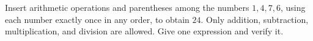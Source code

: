 Insert arithmetic operations and parentheses among the numbers $1,4,7,6$, using each number exactly once in any order, to obtain $24$. Only addition, subtraction, multiplication, and division are allowed. Give one expression and verify it.
